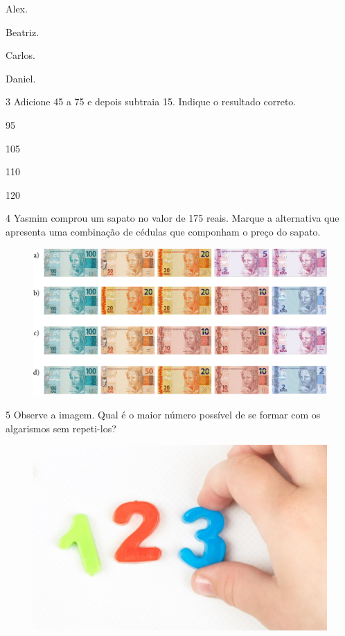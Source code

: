 \begin{escolha}[itemsep=-5pt]
\begin{multicols}{2}
\item Alex.

\item Beatriz.

\item Carlos.

\item Daniel.
\end{multicols}
\end{escolha}

\num{3} Adicione 45 a 75 e depois subtraia 15. Indique o resultado correto.

\begin{multicols}{4}
\begin{escolha}[itemsep=-5pt]
\item 95

\item 105

\item 110

\item 120
\end{escolha}
\end{multicols}

\num{4} Yasmim comprou um sapato no valor de 175 reais. Marque a alternativa que apresenta uma combinação de cédulas que componham o preço do sapato.

\begin{figure}[H]
\centering
\includegraphics[width=\textwidth]{./media/image115.png}
\end{figure}

\pagebreak
\num{5} Observe a imagem. Qual é o maior número possível de se formar com os
algarismos sem repeti-los?

\begin{figure}[H]
\centering
\includegraphics[width=.6\textwidth]{./media/image114.png}
\end{figure}

